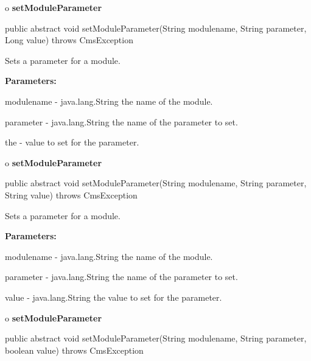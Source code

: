 o {\bf setModuleParameter} 

\begin{PRE}
 public abstract void setModuleParameter(String modulename,
                                         String parameter,
                                         Long value) throws CmsException
\end{PRE}

\begin{description}
\htmlDD Sets a parameter for a module. 

\begin{description}
\item {\bf Parameters:}  

modulename - java.lang.String the name of the module.  

parameter - java.lang.String the name of the parameter to set.  

the - value to set for the parameter.  
\end{description}

\end{description}

o {\bf setModuleParameter} 

\begin{PRE}
 public abstract void setModuleParameter(String modulename,
                                         String parameter,
                                         String value) throws CmsException
\end{PRE}

\begin{description}
\htmlDD Sets a parameter for a module. 

\begin{description}
\item {\bf Parameters:}  

modulename - java.lang.String the name of the module.  

parameter - java.lang.String the name of the parameter to set.  

value - java.lang.String the value to set for the parameter.  
\end{description}

\end{description}

o {\bf setModuleParameter} 

\begin{PRE}
 public abstract void setModuleParameter(String modulename,
                                         String parameter,
                                         boolean value) throws CmsException
\end{PRE}


